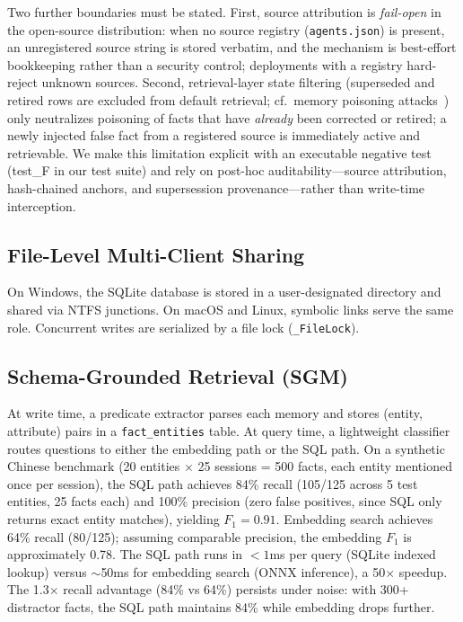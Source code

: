 \documentclass[11pt]{article}
\begin{document}
Two further boundaries must be stated. First, source attribution is \emph{fail-open} in the open-source distribution: when no source registry (\texttt{agents.json}) is present, an unregistered source string is stored verbatim, and the mechanism is best-effort bookkeeping rather than a security control; deployments with a registry hard-reject unknown sources. Second, retrieval-layer state filtering (superseded and retired rows are excluded from default retrieval; cf.\ memory poisoning attacks~\citep{sleeper,agentpoison}) only neutralizes poisoning of facts that have \emph{already} been corrected or retired; a newly injected false fact from a registered source is immediately active and retrievable. We make this limitation explicit with an executable negative test (test\_F in our test suite) and rely on post-hoc auditability---source attribution, hash-chained anchors, and supersession provenance---rather than write-time interception.

\subsection{File-Level Multi-Client Sharing}
On Windows, the SQLite database is stored in a user-designated directory and shared via NTFS junctions. On macOS and Linux, symbolic links serve the same role. Concurrent writes are serialized by a file lock (\texttt{\_FileLock}).

\subsection{Schema-Grounded Retrieval (SGM)}
At write time, a predicate extractor parses each memory and stores (entity, attribute) pairs in a \texttt{fact\_entities} table. At query time, a lightweight classifier routes questions to either the embedding path or the SQL path. On a synthetic Chinese benchmark (20 entities $\times$ 25 sessions = 500 facts, each entity mentioned once per session), the SQL path achieves 84\% recall (105/125 across 5 test entities, 25 facts each) and 100\% precision (zero false positives, since SQL only returns exact entity matches), yielding $F_1 = 0.91$. Embedding search achieves 64\% recall (80/125); assuming comparable precision, the embedding $F_1$ is approximately 0.78. The SQL path runs in $< 1$ms per query (SQLite indexed lookup) versus $\sim$50ms for embedding search (ONNX inference), a 50$\times$ speedup. The 1.3$\times$ recall advantage (84\% vs 64\%) persists under noise: with 300+ distractor facts, the SQL path maintains 84\% while embedding drops further.
\end{document}
